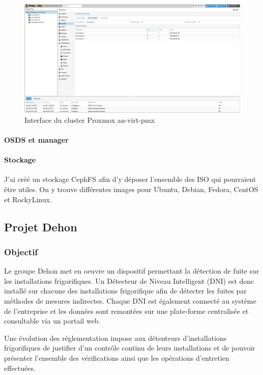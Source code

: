 \documentclass[12pt]{article}
\begin{document}
\begin{figure}
    \centering
        \includegraphics[width=\textwidth]{src/proxmox_interface.png}
    \caption{Interface du cluster Proxmox an-virt-pmx}
    \label{fig:proxmox_virt1}
\end{figure}

\paragraph{OSDS et manager}


\paragraph{Stockage}
J'ai créé un stockage CephFS afin d'y déposer l'ensemble des ISO qui pourraient être utiles. On y trouve différentes images pour Ubuntu, Debian, Fedora, CentOS et RockyLinux.

\newpage
\subsection{Projet Dehon} \label{dehon}
\subsubsection{Objectif}

Le groupe Dehon met en oeuvre un dispositif permettant la détection de fuite sur les installations frigorifiques. Un Détecteur de Niveau Intelligent (DNI) est donc installé sur chacune des installations frigorifique afin de détecter les fuites par méthodes de mesures indirectes.
Chaque DNI est également connecté au système de l'entreprise et les données sont remontées sur une plate-forme centralisée et consultable via un portail web. 

Une évolution des réglementation impose aux détenteurs d'installations frigorifiques de justifier d'un contrôle continu de leurs installations et de pouvoir présenter l'ensemble des vérifications ainsi que les opérations d'entretien effectuées.
\end{document}
